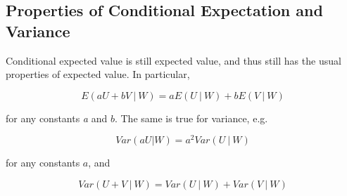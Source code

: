 \documentclass[11pt]{article}
\begin{document}
% 
% 
% 


\subsection{Properties of Conditional Expectation and Variance}

Conditional expected value is still expected value, and thus still has
the usual properties of expected value.  In particular,

\begin{equation}
E(aU + bV ~|~ W) = a E(U ~|~ W) + b E(V ~|~ W)
\end{equation}

for any constants {\it a} and $b$.  The same is true for variance, e.g.

\begin{equation}
Var(aU | W) = a^2 Var(U ~|~ W)
\end{equation}

for any constants $a$, and 

\begin{equation}
Var(U + V ~|~ W) = Var(U ~|~ W) + Var(V ~|~ W)
\end{equation}
\end{document}
